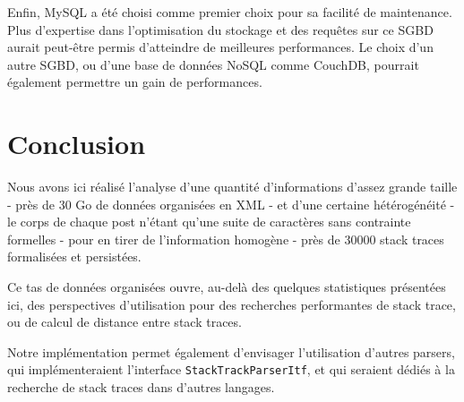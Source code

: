 \documentclass[11pt,a4paper]{article}
\begin{document}
Enfin, MySQL a été choisi comme premier choix pour sa facilité de maintenance.
Plus d'expertise dans l'optimisation du stockage et des requêtes sur ce SGBD aurait peut-être permis d'atteindre de meilleures performances.
Le choix d'un autre SGBD, ou d'une base de données NoSQL comme CouchDB\cite{sql-vs-nosql}, pourrait également permettre un gain de performances.

\section{Conclusion}
Nous avons ici réalisé l'analyse d'une quantité d'informations d'assez grande taille - près de 30 Go de données organisées en XML - et d'une certaine hétérogénéité - le corps de chaque post n'étant qu'une suite de caractères sans contrainte formelles - pour en tirer de l'information homogène - près de 30000 stack traces formalisées et persistées.

Ce tas de données organisées ouvre, au-delà des quelques statistiques présentées ici, des perspectives d'utilisation pour des recherches performantes de stack trace, ou de calcul de distance entre stack traces.

Notre implémentation\cite{sources} permet également d'envisager l'utilisation d'autres parsers, qui implémenteraient l'interface \texttt{StackTrackParserItf}, et qui seraient dédiés à la recherche de stack traces dans d'autres langages.



\end{document}
